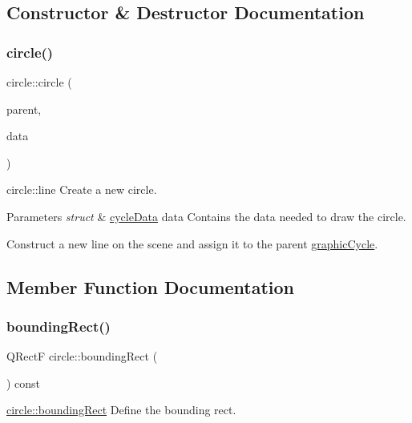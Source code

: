 \subsection{Constructor \& Destructor Documentation}
\mbox{\label{classcircle_abfd721dc65145023cf14739adacc81a8}} 
\subsubsection{\texorpdfstring{circle()}{circle()}}
{\footnotesize\ttfamily circle\+::circle (\begin{DoxyParamCaption}\item[{\mbox{\hyperlink{classgraphic_cycle}{graphic\+Cycle}} $\ast$}]{parent,  }\item[{struct \mbox{\hyperlink{structcycle_data}{cycle\+Data}}}]{data }\end{DoxyParamCaption})}



circle\+::line Create a new circle. 


\begin{DoxyParams}{Parameters}
{\em struct} & \mbox{\hyperlink{structcycle_data}{cycle\+Data}} data Contains the data needed to draw the circle.\\
\hline
\end{DoxyParams}
Construct a new line on the scene and assign it to the parent \mbox{\hyperlink{classgraphic_cycle}{graphic\+Cycle}}. 

\subsection{Member Function Documentation}
\mbox{\label{classcircle_ab9d2059829ac8f0420c7e711caeb61c7}} 
\subsubsection{\texorpdfstring{bounding\+Rect()}{boundingRect()}}
{\footnotesize\ttfamily Q\+RectF circle\+::bounding\+Rect (\begin{DoxyParamCaption}{ }\end{DoxyParamCaption}) const}



\mbox{\hyperlink{classcircle_ab9d2059829ac8f0420c7e711caeb61c7}{circle\+::bounding\+Rect}} Define the bounding rect. 

